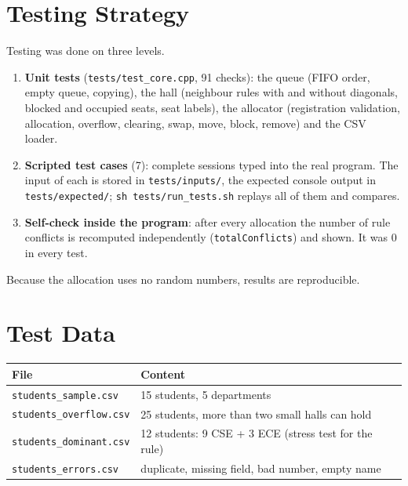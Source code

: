 \documentclass[12pt,a4paper]{report}
\begin{document}
\section{Testing Strategy}
Testing was done on three levels.
\begin{enumerate}
  \item \textbf{Unit tests} (\texttt{tests/test\_core.cpp}, 91 checks): the queue (FIFO order, empty queue, copying), the hall (neighbour rules with and without diagonals, blocked and occupied seats, seat labels), the allocator (registration validation, allocation, overflow, clearing, swap, move, block, remove) and the CSV loader.
  \item \textbf{Scripted test cases} (7): complete sessions typed into the real program. The input of each is stored in \texttt{tests/inputs/}, the expected console output in \texttt{tests/expected/}; \texttt{sh tests/run\_tests.sh} replays all of them and compares.
  \item \textbf{Self-check inside the program}: after every allocation the number of rule conflicts is recomputed independently (\texttt{totalConflicts}) and shown. It was 0 in every test.
\end{enumerate}
Because the allocation uses no random numbers, results are reproducible.

\section{Test Data}
\begin{center}
\begin{tabular}{ll}
\toprule
\textbf{File} & \textbf{Content}\\
\midrule
\texttt{students\_sample.csv} & 15 students, 5 departments\\
\texttt{students\_overflow.csv} & 25 students, more than two small halls can hold\\
\texttt{students\_dominant.csv} & 12 students: 9 CSE + 3 ECE (stress test for the rule)\\
\texttt{students\_errors.csv} & duplicate, missing field, bad number, empty name\\
\bottomrule
\end{tabular}
\end{center}
\end{document}
